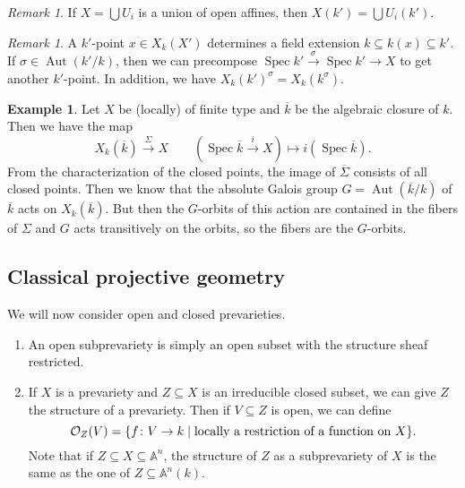 \documentclass[leqno, openany]{memoir}
\theoremstyle{definition}
\newtheorem{exm}[thm]{Example}
\theoremstyle{remark}
\newtheorem{rmk}[thm]{Remark}
\theoremstyle{plain}
\theoremstyle{definition}
\theoremstyle{remark}
\newcommand{\A}{\mathbb{A}}
\newcommand{\mc}[1]{\mathcal{#1}}
\newcommand{\ol}[1]{\overline{#1}}
\DeclareMathOperator{\Aut}{Aut}
\DeclareMathOperator{\Spec}{Spec}
\begin{document}
\begin{rmk}
    If $X = \bigcup U_i$ is a union of open affines, then $X(k') = \bigcup U_i(k')$. 
\end{rmk}

\begin{rmk}
    A $k'$-point $x \in X_k(X')$ determines a field extension $k \subseteq k(x) \subseteq k'$. If $\sigma \in \Aut(k'/k)$, then we can precompose $\Spec k' \xrightarrow{\sigma} \Spec k' \to X$ to get another $k'$-point. In addition, we have ${X_k(k')^{\sigma} = X_k(k^{\sigma})}$.
\end{rmk}

\begin{exm}
    Let $X$ be (locally) of finite type and $\ol{k}$ be the algebraic closure of $k$. Then we have the map
    \[ X_k(\ol{k}) \xrightarrow{\Sigma} X \qquad (\Spec \ol{k} \xrightarrow{i} X) \mapsto i(\Spec \ol{k}). \]
    From the characterization of the closed points, the image of $\ol{\Sigma}$ consists of all closed points. Then we know that the absolute Galois group $G = \Aut(\ol{k} / k)$ of $\ol{k}$ acts on $X_k(\ol{k})$. But then the $G$-orbits of this action are contained in the fibers of $\Sigma$ and $G$ acts transitively on the orbits, so the fibers are the $G$-orbits. 
\end{exm}

\subsection{Classical projective geometry}%
\label{sub:classical_projective_geometry}

We will now consider open and closed prevarieties.
\begin{enumerate}
    \item An open subprevariety is simply an open subset with the structure sheaf restricted.
    \item If $X$ is a prevariety and $Z \subseteq X$ is an irreducible closed subset, we can give $Z$ the structure of a prevariety. Then if $V \subseteq Z$ is open, we can define
        \[ \mc{O}_Z(V) = \qty{f \colon V \to k \mid \text{locally a restriction of a function on $X$}}. \]
        Note that if $Z \subseteq X \subseteq \A^n$, the structure of $Z$ as a subprevariety of $X$ is the same as the one of $Z \subseteq \A^n(k)$.
\end{enumerate}
\end{document}
